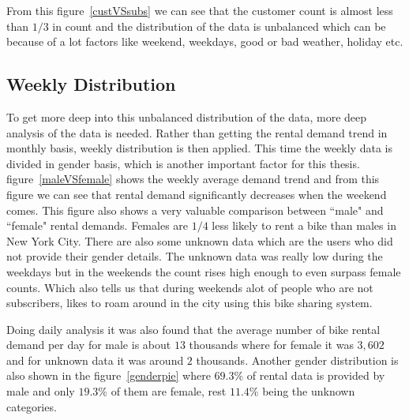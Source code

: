 From this figure~\ref{custVSsubs} we can see that the customer count is almost less than $1/3$ in count and the distribution of the data is unbalanced which can be because of a lot factors like weekend, weekdays, good or bad weather, holiday etc. 


\subsection {Weekly Distribution}
\label{week}

To get more deep into this unbalanced distribution of the data, more deep analysis of the data is needed. Rather than getting the rental demand trend in monthly basis, weekly distribution is then applied. This time the weekly data is divided in gender basis, which is another important factor for this thesis. figure~\ref{maleVSfemale} shows the weekly average demand trend and from this figure we can see that rental demand significantly decreases when the weekend comes. This figure also shows a very valuable comparison between ``male" and ``female" rental demands. Females are $1/4$ less likely to rent a bike than males in New York City. There are also some unknown data which are the users who did not provide their gender details. The unknown data was really low during the weekdays but in the weekends the count rises high enough to even surpass female counts. Which also tells us that during weekends alot of people who are not subscribers, likes to roam around in the city using this bike sharing system. 

Doing daily analysis it was also found that the average number of bike rental demand per day for male is about $13$ thousands where for female it was $3,602$ and for unknown data it was around $2$ thousands. Another gender distribution is also shown in the figure~\ref{genderpie} where $69.3\%$ of rental data is provided by male and only $19.3\%$ of them are female, rest $11.4\%$ being the unknown categories. 
    


